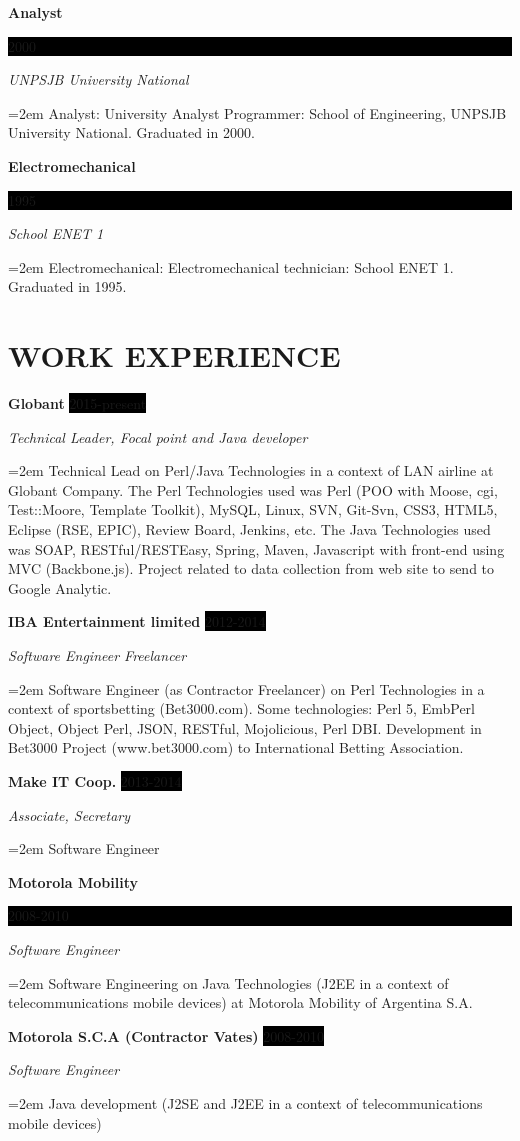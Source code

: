 \documentclass[paper=a4,fontsize=11pt]{scrartcl} %
\newcommand{\sepspace}{\vspace*{1em}}		%
\newcommand{\NewPart}[1]{\section*{\uppercase{#1}}}
\newcommand{\EducationEntry}[4]{ %
		\noindent \textbf{#1} \hfill      %
		\colorbox{Black}{%
			\parbox{6em}{%
			\hfill\color{White}#2}} \par  %
		\noindent \textit{#3} \par        %
		\noindent\hangindent=2em\hangafter=0 \small #4 %
		\normalsize \par}
\newcommand{\WorkEntry}[4]{				  %
		\noindent \textbf{#1} \hfill      %
		\colorbox{Black}{\color{White}#2} \par  %
		\noindent \textit{#3} \par              %
		\noindent\hangindent=2em\hangafter=0 \small #4 %
		\normalsize \par}
\begin{document}
\EducationEntry{Analyst}{2000}{UNPSJB University National}{Analyst: University Analyst Programmer: School of Engineering, UNPSJB University National. Graduated in 2000.}
\sepspace

\EducationEntry{Electromechanical}{1995}{School ENET 1}{Electromechanical: Electromechanical technician: School ENET 1. Graduated in 1995.}
\sepspace

\NewPart{Work experience}{}

\WorkEntry{Globant}{2015-present}{Technical Leader, Focal point and Java developer}
{Technical Lead on Perl/Java Technologies in a context of LAN airline at Globant Company. The Perl Technologies used was Perl (POO with Moose, cgi, Test::Moore, Template Toolkit), MySQL, Linux, SVN, Git-Svn, CSS3, HTML5, Eclipse (RSE, EPIC), Review Board, Jenkins, etc. The Java Technologies used was SOAP, RESTful/RESTEasy, Spring, Maven, Javascript with front-end using MVC (Backbone.js). Project related to data collection from web site to send to Google Analytic.}
\sepspace

\WorkEntry{IBA Entertainment limited}{2012-2014}{Software Engineer Freelancer}
{Software Engineer (as Contractor Freelancer) on Perl Technologies in a context of sportsbetting (Bet3000.com). Some technologies: Perl 5, EmbPerl Object, Object Perl, JSON, RESTful, Mojolicious, Perl DBI. Development in Bet3000 Project (www.bet3000.com) to International Betting Association.}
\sepspace

\WorkEntry{Make IT Coop.}{2013-2014}{Associate, Secretary}{
Software Engineer}
\sepspace

\EducationEntry{Motorola Mobility}{2008-2010}{Software Engineer}
{Software Engineering on Java Technologies (J2EE in a context of telecommunications mobile devices) at Motorola Mobility of Argentina S.A.}
\sepspace

\WorkEntry{Motorola S.C.A (Contractor Vates)}{2008-2010}{Software Engineer}
{Java development (J2SE and J2EE in a context of telecommunications mobile devices)}
\sepspace
\end{document}
